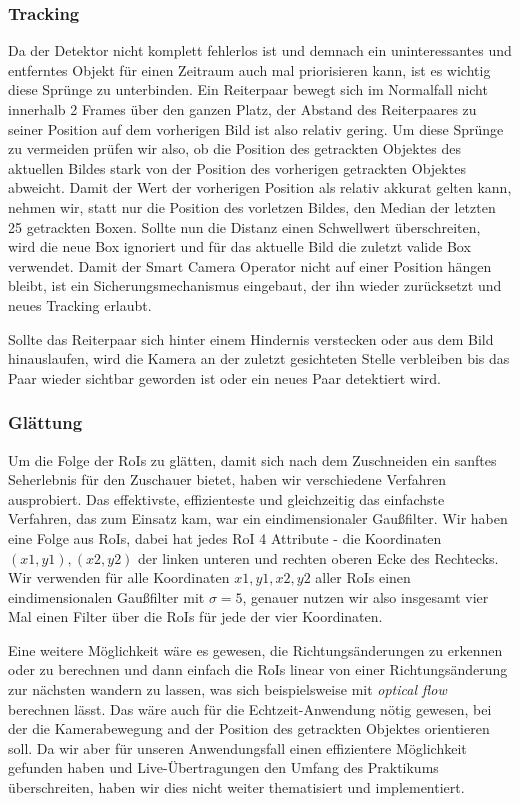 \subsubsection*{Tracking}
Da der Detektor nicht komplett fehlerlos ist und demnach ein uninteressantes und entferntes Objekt für einen Zeitraum auch mal priorisieren kann, ist es wichtig diese Sprünge zu unterbinden. Ein Reiterpaar bewegt sich im Normalfall nicht innerhalb 2 Frames über den ganzen Platz, der Abstand des Reiterpaares zu seiner Position auf dem vorherigen Bild ist also relativ gering. Um diese Sprünge zu vermeiden prüfen wir also, ob die Position des getrackten Objektes des aktuellen Bildes stark von der Position des vorherigen getrackten Objektes abweicht. Damit der Wert der vorherigen Position als relativ akkurat gelten kann, nehmen wir, statt nur die Position des vorletzen Bildes, den Median der letzten 25 getrackten Boxen. Sollte nun die Distanz einen Schwellwert überschreiten, wird die neue Box ignoriert und für das aktuelle Bild die zuletzt valide Box verwendet. Damit der Smart Camera Operator nicht auf einer Position hängen bleibt, ist ein Sicherungsmechanismus eingebaut, der ihn wieder zurücksetzt und neues Tracking erlaubt.

Sollte das Reiterpaar sich hinter einem Hindernis verstecken oder aus dem Bild hinauslaufen, wird die Kamera an der zuletzt gesichteten Stelle verbleiben bis das Paar wieder sichtbar geworden ist oder ein neues Paar detektiert wird.

\subsubsection*{Glättung}
Um die Folge der RoIs zu glätten, damit sich nach dem Zuschneiden ein sanftes Seherlebnis für den Zuschauer bietet, haben wir verschiedene Verfahren ausprobiert.
Das effektivste, effizienteste und gleichzeitig das einfachste Verfahren, das zum Einsatz kam, war ein eindimensionaler Gaußfilter.
Wir haben eine Folge aus RoIs, dabei hat jedes RoI 4 Attribute - die Koordinaten $(x1,y1), (x2,y2)$ der linken unteren und rechten oberen Ecke des Rechtecks.
Wir verwenden für alle Koordinaten $x1, y1, x2, y2$ aller RoIs einen  eindimensionalen Gaußfilter mit $\sigma=5$, genauer nutzen wir also insgesamt vier Mal einen Filter über die RoIs für jede der vier Koordinaten.

Eine weitere Möglichkeit wäre es gewesen, die Richtungsänderungen zu erkennen oder zu berechnen und dann einfach die RoIs linear von einer Richtungsänderung zur nächsten wandern zu lassen, was sich beispielsweise mit \emph{optical flow} berechnen lässt. Das wäre auch für die Echtzeit-Anwendung nötig gewesen, bei der die Kamerabewegung and der Position des getrackten Objektes orientieren soll.
Da wir aber für unseren Anwendungsfall einen effizientere Möglichkeit gefunden haben und Live-Übertragungen den Umfang des Praktikums überschreiten, haben wir dies nicht weiter thematisiert und implementiert. 
